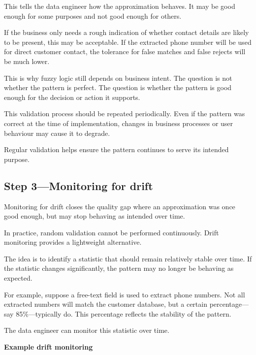 \documentclass[10pt,openany,10pt]{book}
\begin{document}
This tells the data engineer how the approximation behaves. It may be
good enough for some purposes and not good enough for others.

If the business only needs a rough indication of whether contact details
are likely to be present, this may be acceptable. If the extracted phone
number will be used for direct customer contact, the tolerance for false
matches and false rejects will be much lower.

This is why fuzzy logic still depends on business intent. The question
is not whether the pattern is perfect. The question is whether the
pattern is good enough for the decision or action it supports.

This validation process should be repeated periodically. Even if the
pattern was correct at the time of implementation, changes in business
processes or user behaviour may cause it to degrade.

Regular validation helps ensure the pattern continues to serve its
intended purpose.

\subsection{Step 3---Monitoring for
drift}\label{step-3monitoring-for-drift}

Monitoring for drift closes the quality gap where an approximation was
once good enough, but may stop behaving as intended over time.

In practice, random validation cannot be performed continuously. Drift
monitoring provides a lightweight alternative.

The idea is to identify a statistic that should remain relatively stable
over time. If the statistic changes significantly, the pattern may no
longer be behaving as expected.

For example, suppose a free-text field is used to extract phone numbers.
Not all extracted numbers will match the customer database, but a
certain percentage---say 85\%---typically do. This percentage reflects
the stability of the pattern.

The data engineer can monitor this statistic over time.

\textbf{Example drift monitoring}
\end{document}
